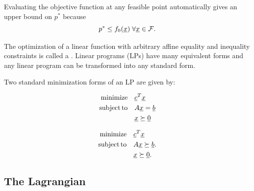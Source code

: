 Evaluating the objective function at any feasible point automatically gives an upper bound on $p^*$ because
\[ p^* \leq f_0 (\underline{x}) \; \forall \underline{x}\in \mathcal{F}. \]

The optimization of a linear function with arbitrary affine equality and inequality constraints is called a .
Linear programs (LPs) have many equivalent forms and any linear program can be transformed into any standard form.

\begin{definition} \label{def:standard_lp}
Two standard minimization forms of an LP are given by:\\ \begin{minipage}{0.49\textwidth}
\vspace{-2mm}
\begin{align*}
\mathrm{minimize} \quad & \underline{c}^T \underline{x} \\
\mathrm{subject\,to} \quad & A \underline{x} = \underline{b} \\
& \underline{x} \succeq \underline{0}
\end{align*}
\end{minipage}
\begin{minipage}{0.49\textwidth}
\vspace{-2mm}
\begin{align*}
\mathrm{minimize} \quad & \underline{c}^T \underline{x} \\
\mathrm{subject\,to} \quad & A \underline{x} \succeq \underline{b}. \\
& \underline{x} \succeq \underline{0}.
\end{align*}
\end{minipage}
\end{definition}



\subsection{The Lagrangian}

